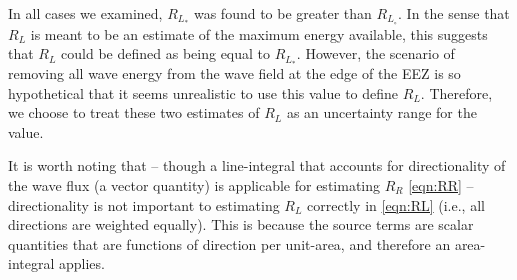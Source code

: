In all cases we examined, $R_{L_*}$ was found to be greater than $R_{L_\circ}$.
In the sense that $R_L$ is meant to be an estimate of the maximum energy available, this suggests that $R_L$ could be defined as being equal to $R_{L_*}$. However, the scenario of removing all wave energy from the wave field at the edge of the EEZ is so hypothetical that it seems unrealistic to use this value to define $R_L$. Therefore, we choose to treat these two estimates of $R_L$ as an uncertainty range for the value.

It is worth noting that -- though a line-integral that accounts for directionality of the wave flux (a vector quantity) is applicable for estimating $R_R$ \eqref{eqn:RR} -- directionality is not important to estimating $R_L$ correctly in \eqref{eqn:RL} (i.e., all directions are weighted equally). This is because the source terms are scalar quantities that are functions of direction per unit-area, and therefore an area-integral applies.


